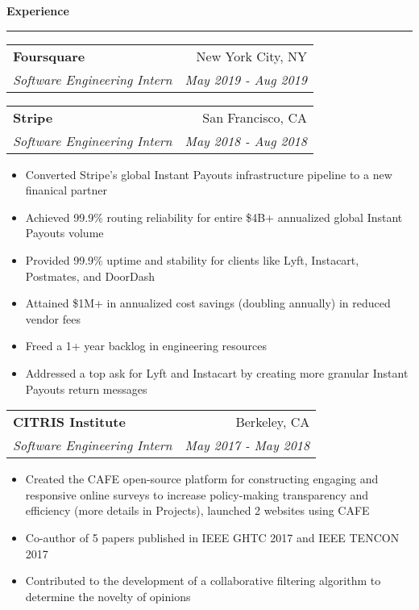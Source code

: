 \documentclass[11pt,letterpaper]{article}
\makeatletter
\newenvironment{topic}[1]
    {
    {\Large \centerline{#1}}
    \vspace*{0.03in}
    \hrule 
    \vspace*{0.05in}
    }
    {}
\newenvironment{event}
    {
    \begin{tabular*}{\textwidth}{l@{\extracolsep{\fill}}r}
    }
    {
    \end{tabular*}
    }
\makeatother
\begin{document}
    \begin{topic}{\textbf{Experience}}
        \begin{event}
            \textbf{Foursquare} & New York City, NY \\
            \emph{Software Engineering Intern} & \emph{May 2019 - Aug 2019} \\
        \end{event}

        \begin{event}
            \textbf{Stripe} & San Francisco, CA \\
            \emph{Software Engineering Intern} & \emph{May 2018 - Aug 2018} \\
        \end{event}
            \begin{itemize}
                \item Converted Stripe's global Instant Payouts infrastructure pipeline to a new finanical partner
                \setlength{\itemindent}{0.21in}
                \item Achieved 99.9\% routing reliability for entire \$4B+ annualized global Instant Payouts volume
                \item Provided 99.9\% uptime and stability for clients like Lyft, Instacart, Postmates, and DoorDash
                \item Attained \$1M+ in annualized cost savings (doubling annually) in reduced vendor fees
                \item Freed a 1+ year backlog in engineering resources
                \setlength{\itemindent}{0in}
                \item Addressed a top ask for Lyft and Instacart by creating more granular Instant Payouts return messages
            \end{itemize}
            
        \begin{event}
            \textbf{CITRIS Institute} & Berkeley, CA \\
            \emph{Software Engineering Intern} & \emph{May 2017 - May 2018}
        \end{event}
            \begin{itemize}
                \item Created the CAFE open-source platform for constructing engaging and responsive online surveys to increase policy-making transparency and efficiency (more details in Projects), launched 2 websites using CAFE
                \item Co-author of 5 papers published in IEEE GHTC 2017 and IEEE TENCON 2017
                \item Contributed to the development of a collaborative filtering algorithm to determine the novelty of opinions
            \end{itemize}


\end{topic}
\end{document}
